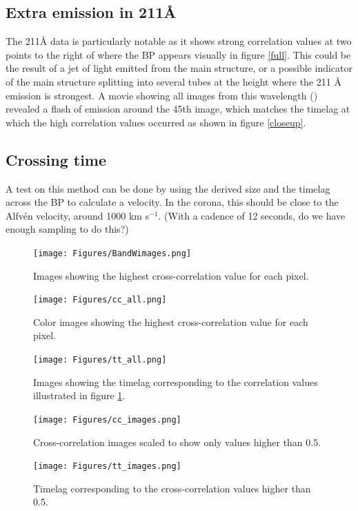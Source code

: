 \documentclass[preprint2]{aastex}
\begin{document}
\subsection{Extra emission in 211\AA{}}
The 211\AA{} data is particularly notable as it shows strong correlation values
at two points to the right of where the BP appears visually in figure \ref{full}.
This could be the result of a jet of light emitted from the main structure, or a
possible indicator of the main structure splitting into several tubes at the
height where the 211 \AA{} emission is strongest.
A movie showing all images from this wavelength (\cite{ssw}) revealed a flash
of emission around the 45th image,
which matches the timelag at which the high correlation values occurred as shown
in figure \ref{closeup}.

\subsection{Crossing time}
A test on this method can be done by using the derived size and the timelag across
the BP to calculate a velocity. In the corona, this should be close to the
Alfv\'en velocity, around 1000 km s$^{-1}$. (With a cadence of 12 seconds, do
we have enough sampling to do this?)

\begin{figure}[htb!]
    \texttt{[image: Figures/BandWimages.png]}
    \caption{Images showing the highest cross-correlation value for each pixel. }
    \label{cc_all}
\end{figure}

\begin{figure}[htb!]
    \texttt{[image: Figures/cc\_all.png]}
    \caption{Color images showing the highest cross-correlation value for each pixel. }
    \label{cc_all_color}
\end{figure}

\begin{figure}[htb!]
    \texttt{[image: Figures/tt\_all.png]}
    \caption{Images showing the timelag corresponding to the correlation values
        illustrated in figure \ref{cc_all}.}
    \label{tt_all}
\end{figure}

\begin{figure}[htb!]
    \texttt{[image: Figures/cc\_images.png]}
    \caption{Cross-correlation images scaled to show only values higher than 0.5.}
    \label{cc}
\end{figure}

\begin{figure}[htb!]
    \texttt{[image: Figures/tt\_images.png]}
    \caption{Timelag corresponding to the cross-correlation values higher than 0.5.}
    \label{tt}
\end{figure}
\end{document}
